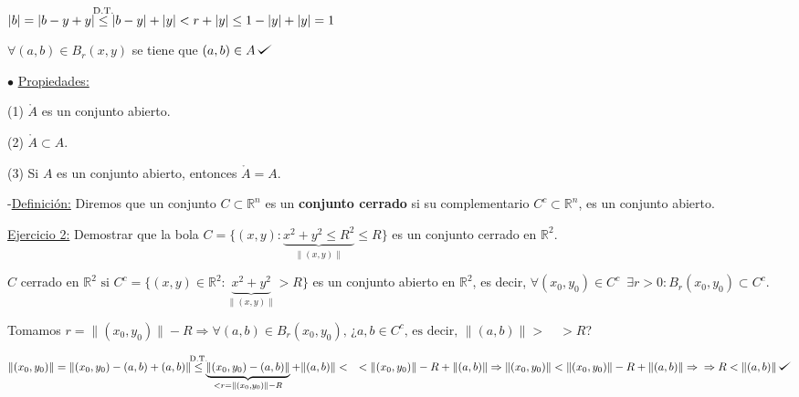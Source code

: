 \documentclass[12pt, titlepage]{article}
\def\checkmark{\tikz\fill[scale=0.4](0,.35) -- (.25,0) -- (1,.7) -- (.25,.15) -- cycle;}
\newcommand{\leqc}[1]{\stackrel{\mathclap{\normalfont\mbox{\scriptsize{#1}}}}{\leq}}
\newcommand{\R}{\mathbb{R}}
\newcommand{\spac}{\, \, \,}
\begin{document}
$|b| = |b - y + y| \leqc{D.T.} |b - y| +|y| < r + |y| \leq 1 - |y| + |y| = 1$
\vspace{3mm}

$\forall (a, b) \in B_r(x, y)$ se tiene que $(a, b) \in A \, \checkmark$
\vspace{5mm}


\noindent$\bullet$ \underline{Propiedades:}
\vspace{3mm}

(1) $\mathring{A}$ es un conjunto abierto.
\vspace{3mm}

(2) $\mathring{A} \subset A$.
\vspace{3mm}

(3) Si $A$ es un conjunto abierto, entonces $\mathring{A} = A$.
\vspace{5mm}

\noindent-\underline{Definición:} Diremos que un conjunto $C \subset \R^n$ es un \textbf{conjunto cerrado} si su complementario $C^c \subset \R^n$, es un conjunto abierto.
\vspace{3mm}

\underline{Ejercicio 2:} Demostrar que la bola $C = \{ (x, y) : \underbrace{x^2 + y^2 \leq R^2}_{\|(x, y)\|} \leq R\}$ es un conjunto cerrado en $\R^2$.
\vspace{3mm}

$C$  cerrado en $\R^2 \text{ si } C^c = \{(x, y) \in \R^2 : \underbrace{x^2 + y^2}_{\|(x, y)\|} > R\}$ es un conjunto abierto en $\R^2$, es decir, $\forall (x_0, y_0) \in C^c \spac \exists r > 0 : B_r (x_0, y_0) \subset C^c$.
\vspace{3mm}

Tomamos $r = \| (x_0, y_0) \| - R \Rightarrow \forall (a, b) \in B_r (x_0, y_0) \text{, ¿} a, b \in C^c \text{, es decir, } \| (a, b) \| > \quad > R$?
\vspace{2mm}

$\| (x_0, y_0) \| = \| (x_0, y_0) - (a, b) + (a, b) \| \leqc{D.T.} \underbrace{\| (x_0, y_0) - (a, b) \|}_{< r = \| (x_0, y_0) \| - R} + \| (a, b) \| < \quad < \| (x_0, y_0) \| - R + \| (a, b) \| \Rightarrow \| (x_0, y_0) \| < \| (x_0, y_0) \| - R + \| (a, b) \| \Rightarrow \\ \Rightarrow R < \| (a, b) \| \, \checkmark$
\end{document}

